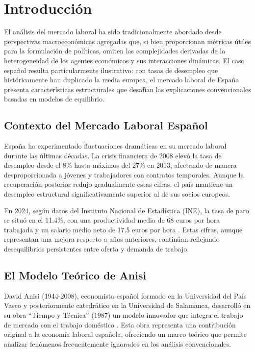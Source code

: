 \section{Introducción}

El análisis del mercado laboral ha sido tradicionalmente abordado desde perspectivas macroeconómicas agregadas que, si bien proporcionan métricas útiles para la formulación de políticas, omiten las complejidades derivadas de la heterogeneidad de los agentes económicos y sus interacciones dinámicas. El caso español resulta particularmente ilustrativo: con tasas de desempleo que históricamente han duplicado la media europea, el mercado laboral de España presenta características estructurales que desafían las explicaciones convencionales basadas en modelos de equilibrio.

\subsection{Contexto del Mercado Laboral Español}

España ha experimentado fluctuaciones dramáticas en su mercado laboral durante las últimas décadas. La crisis financiera de 2008 elevó la tasa de desempleo desde el 8\% hasta máximos del 27\% en 2013, afectando de manera desproporcionada a jóvenes y trabajadores con contratos temporales. Aunque la recuperación posterior redujo gradualmente estas cifras, el país mantiene un desempleo estructural significativamente superior al de sus socios europeos.

En 2024, según datos del Instituto Nacional de Estadística (INE), la tasa de paro se situó en el 11.4\%, con una productividad media de 68 euros por hora trabajada y un salario medio neto de 17.5 euros por hora \cite{ineEPA2024, ineSalario2024, eurostatProd2024}. Estas cifras, aunque representan una mejora respecto a años anteriores, continúan reflejando desequilibrios persistentes entre oferta y demanda de trabajo.

\subsection{El Modelo Teórico de Anisi}

David Anisi (1944-2008), economista español formado en la Universidad del País Vasco y posteriormente catedrático en la Universidad de Salamanca, desarrolló en su obra ``Tiempo y Técnica'' (1987) un modelo innovador que integra el trabajo de mercado con el trabajo doméstico \cite{anisi1987tiempo}. Esta obra representa una contribución original a la economía laboral española, ofreciendo un marco teórico que permite analizar fenómenos frecuentemente ignorados en los análisis convencionales.

